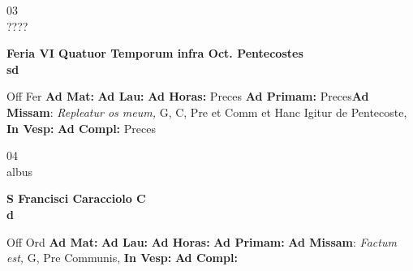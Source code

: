 \documentclass[10pt, openany]{book}
\begin{document}
    \begin{center}
        \begin{minipage}{3.5in}
            \vspace{2em}
            \begin{minipage}{0.5in}
                {\Huge 03} \\
                {\normalsize ????}
            \end{minipage}
            \begin{minipage}{3.0in}
                \textbf{ \large Feria VI Quatuor Temporum infra Oct. Pentecostes \\
                \textnormal{\normalsize sd}}

            \end{minipage}
            \begin{justify}Off Fer
                \textbf{Ad Mat: }
                \textbf{Ad Lau: }
                \textbf{Ad Horas: }Preces
                \textbf{Ad Primam: }Preces\textbf{Ad Missam}: \textit{Repleatur os meum,} G, C, Pre et Comm et Hanc Igitur de Pentecoste, 
                \textbf{In Vesp: }
                \textbf{Ad Compl: }Preces
            \end{justify}
        \end{minipage}
    \end{center}

    \begin{center}
        \begin{minipage}{3.5in}
            \vspace{2em}
            \begin{minipage}{0.5in}
                {\Huge 04} \\
                {\normalsize albus}
            \end{minipage}
            \begin{minipage}{3.0in}
                \textbf{ \large S Francisci Caracciolo C \\
                \textnormal{\normalsize d}}

            \end{minipage}
            \begin{justify}Off Ord
                \textbf{Ad Mat: }
                \textbf{Ad Lau: }
                \textbf{Ad Horas: }
                \textbf{Ad Primam: }\textbf{Ad Missam}: \textit{Factum est,} G, Pre Communis, 
                \textbf{In Vesp: }
                \textbf{Ad Compl: }
            \end{justify}
        \end{minipage}
    \end{center}
\end{document}
